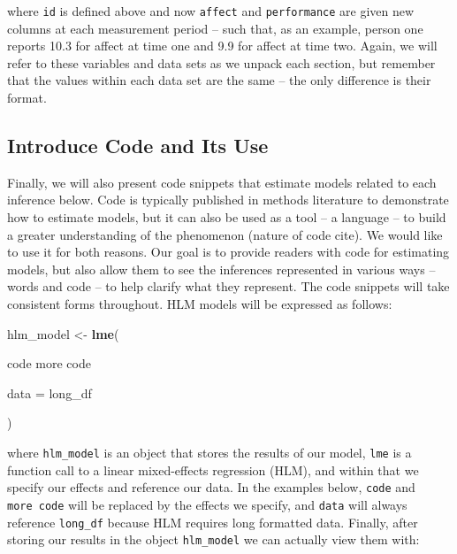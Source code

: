 \documentclass[english,,man]{apa6}
\newenvironment{Shaded}{\begin{snugshade}}{\end{snugshade}}
\newcommand{\DataTypeTok}[1]{\textcolor[rgb]{0.13,0.29,0.53}{#1}}
\newcommand{\KeywordTok}[1]{\textcolor[rgb]{0.13,0.29,0.53}{\textbf{#1}}}
\newcommand{\NormalTok}[1]{#1}
\newcommand{\StringTok}[1]{\textcolor[rgb]{0.31,0.60,0.02}{#1}}
\theoremstyle{definition}
\theoremstyle{definition}
\theoremstyle{definition}
\theoremstyle{remark}
\begin{document}
\noindent where \texttt{id} is defined above and now \texttt{affect} and
\texttt{performance} are given new columns at each measurement period --
such that, as an example, person one reports 10.3 for affect at time one
and 9.9 for affect at time two. Again, we will refer to these variables
and data sets as we unpack each section, but remember that the values
within each data set are the same -- the only difference is their
format.

\hypertarget{introduce-code-and-its-use}{%
\subsection{Introduce Code and Its
Use}\label{introduce-code-and-its-use}}

Finally, we will also present code snippets that estimate models related
to each inference below. Code is typically published in methods
literature to demonstrate how to estimate models, but it can also be
used as a tool -- a language -- to build a greater understanding of the
phenomenon (nature of code cite). We would like to use it for both
reasons. Our goal is to provide readers with code for estimating models,
but also allow them to see the inferences represented in various ways --
words and code -- to help clarify what they represent. The code snippets
will take consistent forms throughout. HLM models will be expressed as
follows:

\begin{Shaded}
\begin{Highlighting}[]
\NormalTok{hlm_model <-}\StringTok{ }\KeywordTok{lme}\NormalTok{(}
  
\NormalTok{  code}
\NormalTok{  more code}
  
  \DataTypeTok{data =}\NormalTok{ long_df}
  
\NormalTok{)}
\end{Highlighting}
\end{Shaded}

\noindent where \texttt{hlm\_model} is an object that stores the results
of our model, \texttt{lme} is a function call to a linear mixed-effects
regression (HLM), and within that we specify our effects and reference
our data. In the examples below, \texttt{code} and \texttt{more\ code}
will be replaced by the effects we specify, and \texttt{data} will
always reference \texttt{long\_df} because HLM requires long formatted
data. Finally, after storing our results in the object
\texttt{hlm\_model} we can actually view them with:
\end{document}
